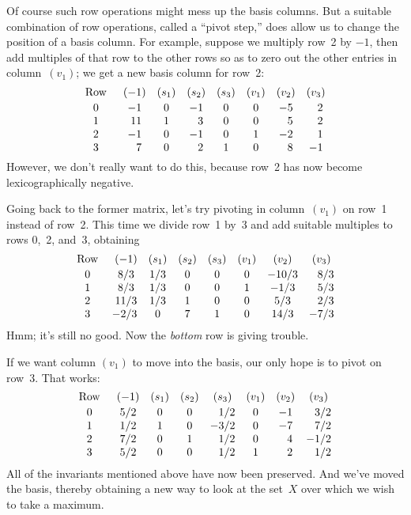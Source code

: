 Of course such row operations might mess up the basis columns. But a suitable
combination of row operations, called a ``pivot step,''
does allow us to change the position of a basis column. For example,
suppose we multiply row~2 by $-1$, then add multiples of that row to the other
rows so as to zero out the other entries in column~$(v_1)$; we get
a new basis column for row~2:
$$\def\\{\phantom-}
\vcenter{\halign{\hfil$#$\hfil\enspace&&\quad\hfil$#$\hfil\cr
\rm Row&(-1)&(s_1)&(s_2)&(s_3)&(v_1)&(v_2)&(v_3)\cr
\noalign{\vskip2pt}
0&-1& 0&-1& 0& 0&-5&\\2\cr
1&\\\llap11&1&\\3& 0& 0&\\5&\\2\cr
2&-1& 0&-1& 0& 1&-2&\\1\cr
3&\\7& 0&\\2& 1& 0&\\8&-1\cr}}$$
However, we don't really want to do this, because row~2 has now become
lexicographically negative.

Going back to the former matrix, let's try pivoting in column~$(v_1)$ on row~1
instead of row~2. This time we divide row~1 by~3 and add suitable
multiples to rows 0,~2, and~3, obtaining
$$\def\\{\phantom-}
\vcenter{\halign{\hfil$#$\hfil\enspace&&\quad\hfil$#$\hfil\cr
\rm Row&(-1)&(s_1)&(s_2)&(s_3)&(v_1)&(v_2)&(v_3)\cr
\noalign{\vskip2pt}
0&8/3&1/3&0&0&0&-10/3&\\8/3\cr
1&8/3&1/3&0&0&1&-1/3&\\5/3\cr
2&11/3&1/3&1&0&0&5/3&\\2/3\cr
3&\phantom0\llap{$-$}2/3&0&7&1&0&14/3&-7/3\cr}}$$
Hmm; it's still no good. Now the {\it bottom\/} row is giving trouble.

If we want column $(v_1)$ to
move into the basis, our only hope is to pivot on row~3. That works:
$$\def\\{\phantom-}
\vcenter{\halign{\hfil$#$\hfil\enspace&&\quad\hfil$#$\hfil\cr
\rm Row&(-1)&(s_1)&(s_2)&(s_3)&(v_1)&(v_2)&(v_3)\cr
\noalign{\vskip2pt}
0&5/2&0&0&\\1/2&0&-1&\\3/2\cr
1&1/2&1&0&-3/2&0&-7&\\7/2\cr
2&7/2&0&1&\\1/2&0&\\4&-1/2\cr
3&5/2&0&0&\\1/2&1&\\2&\\1/2\cr}}$$
All of the invariants mentioned above have now been preserved. And we've moved
the basis, thereby obtaining a new way to look at the set~$X$ over
which we wish to take a maximum.

